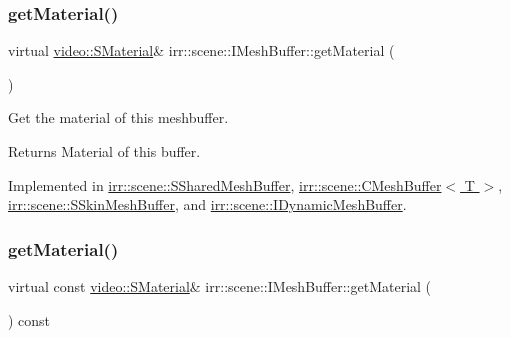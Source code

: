 \mbox{\label{classirr_1_1scene_1_1IMeshBuffer_a26fd922f00fde56abbbbbe40b485238b}} 
\subsubsection{\texorpdfstring{get\+Material()}{getMaterial()}\hspace{0.1cm}{\footnotesize\ttfamily [1/2]}}
{\footnotesize\ttfamily virtual \hyperlink{classirr_1_1video_1_1SMaterial}{video\+::\+S\+Material}\& irr\+::scene\+::\+I\+Mesh\+Buffer\+::get\+Material (\begin{DoxyParamCaption}{ }\end{DoxyParamCaption})\hspace{0.3cm}{\ttfamily [pure virtual]}}



Get the material of this meshbuffer. 

\begin{DoxyReturn}{Returns}
Material of this buffer. 
\end{DoxyReturn}


Implemented in \hyperlink{structirr_1_1scene_1_1SSharedMeshBuffer_ac1dcea2247c8f63adc4a5935ce39bcbc}{irr\+::scene\+::\+S\+Shared\+Mesh\+Buffer}, \hyperlink{classirr_1_1scene_1_1CMeshBuffer_af69e8356b4525a3fee1ddbf188d81e8a}{irr\+::scene\+::\+C\+Mesh\+Buffer$<$ T $>$}, \hyperlink{structirr_1_1scene_1_1SSkinMeshBuffer_a5e4a6cc69dac5ac75d43d8e89a23da2b}{irr\+::scene\+::\+S\+Skin\+Mesh\+Buffer}, and \hyperlink{classirr_1_1scene_1_1IDynamicMeshBuffer_a6ed3a5ce948ebef063b7ea9e07974eb7}{irr\+::scene\+::\+I\+Dynamic\+Mesh\+Buffer}.

\mbox{\label{classirr_1_1scene_1_1IMeshBuffer_a341c1da2fd0cd556a15aab06d07dbbaa}} 
\subsubsection{\texorpdfstring{get\+Material()}{getMaterial()}\hspace{0.1cm}{\footnotesize\ttfamily [2/2]}}
{\footnotesize\ttfamily virtual const \hyperlink{classirr_1_1video_1_1SMaterial}{video\+::\+S\+Material}\& irr\+::scene\+::\+I\+Mesh\+Buffer\+::get\+Material (\begin{DoxyParamCaption}{ }\end{DoxyParamCaption}) const\hspace{0.3cm}{\ttfamily [pure virtual]}}



